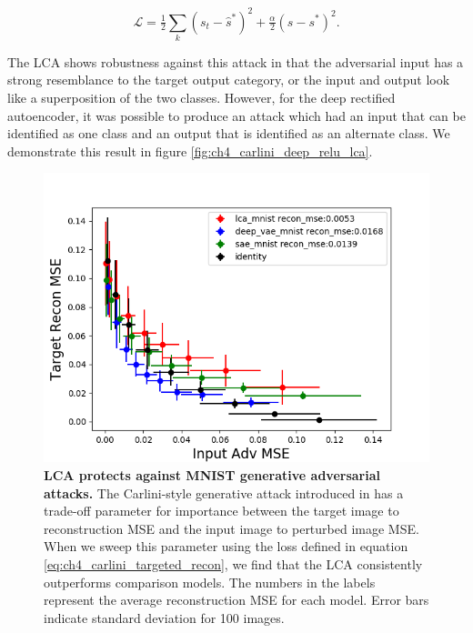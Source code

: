 \begin{equation}\label{eq:ch4_kos_carlini_attack}
    \mathcal{L} = \tfrac{1}{2} \sum_{k}\left(s_{t} - \hat{s}^{*}\right)^{2} + \tfrac{\alpha}{2}\left(s - s^{*}\right)^{2}.
\end{equation}

The LCA shows robustness against this attack in that the adversarial input has a strong resemblance to the target output category, or the input and output look like a superposition of the two classes. However, for the deep rectified autoencoder, it was possible to produce an attack which had an input that can be identified as one class and an output that is identified as an alternate class. We demonstrate this result in figure \ref{fig:ch4_carlini_deep_relu_lca}.

\begin{figure}[h]
    \begin{center}
    \centerline{\includegraphics[width=\columnwidth]{figures/recon_mult_tradeoff.png}}
    \end{center}
    \caption{\textbf{LCA protects against MNIST generative adversarial attacks.} The Carlini-style generative attack introduced in \parencite{kos2018adversarial} has a trade-off parameter for importance between the target image to reconstruction MSE and the input image to perturbed image MSE. When we sweep this parameter using the loss defined in equation \eqref{eq:ch4_carlini_targeted_recon}, we find that the LCA consistently outperforms comparison models. The numbers in the labels represent the average reconstruction MSE for each model. Error bars indicate standard deviation for 100 images.}
    \label{fig:ch4_kos_generative_attack}
\end{figure}

